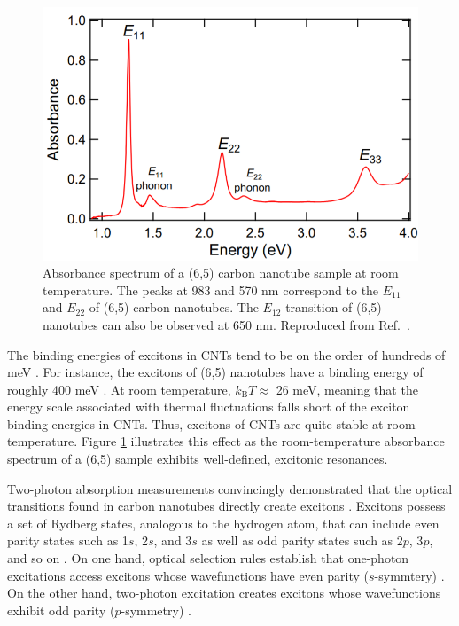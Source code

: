 \begin{figure}[ht]
	\centering
	\includegraphics[scale=0.6]{images/chapter_intro/abs_fumiya}
	\caption{Absorbance spectrum of a (6,5) carbon nanotube sample at room temperature. The peaks at 983 and 570 nm correspond to the $E_{11}$ and $E_{22}$ of (6,5) carbon nanotubes. The $E_{12}$ transition of (6,5) nanotubes can also be observed at 650 nm. Reproduced from Ref.\ \cite{katsutani2019direct}. }
	\label{fig:cnt_abs_fumiya}
\end{figure}

The binding energies of excitons in CNTs tend to be on the order of hundreds of meV \cite{wang2005optical}. For instance, the excitons of (6,5) nanotubes have a binding energy of roughly 400 meV \cite{wang2005optical}. At room temperature, $k_\text{B} T \approx$ 26 meV, meaning that the energy scale associated with thermal fluctuations falls short of the exciton binding energies in CNTs. Thus, excitons of CNTs are quite stable at room temperature. Figure \ref{fig:cnt_abs_fumiya} illustrates this effect as the room-temperature absorbance spectrum of a (6,5) sample exhibits well-defined, excitonic resonances.

Two-photon absorption measurements convincingly demonstrated that the optical transitions found in carbon nanotubes directly create excitons \cite{maultzsch2005exciton, wang2005optical}. Excitons possess a set of Rydberg states, analogous to the hydrogen atom, that can include even parity states such as 1$s$, 2$s$, and 3$s$ as well as odd parity states such as 2$p$, 3$p$, and so on \cite{wang2005optical}. On one hand, optical selection rules establish that one-photon excitations access excitons whose wavefunctions have even parity ($s$-symmtery) \cite{wang2005optical}. On the other hand, two-photon excitation creates excitons whose wavefunctions exhibit odd parity ($p$-symmetry) \cite{wang2005optical}.

